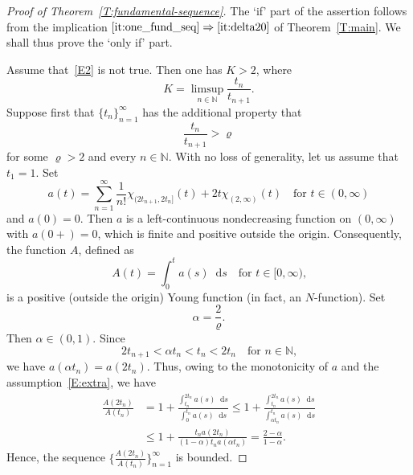\documentclass[nointlimits]{amsart}
\numberwithin{equation}{section}
\theoremstyle{plain}
\theoremstyle{definition}
\newcommand{\N}{\mathbb{N}}
\newcommand*\dd{\mathop{}\!\mathrm{d}}
\begin{document}
\begin{proof}[Proof of Theorem~\ref{T:fundamental-sequence}] 
The `if' part of the assertion follows from the implication 
$\ref{it:one_fund_seq}
\Rightarrow
\ref{it:delta20}
$ of Theorem~\ref{T:main}. We shall thus prove the `only if' part.

Assume that~\eqref{E2} is not true. Then one has $K>2$, where 
\begin{equation*}
    K=\limsup_{n\in\N} \frac{t_n}{t_{n+1}}.
\end{equation*}
Suppose first that $\{t_n\}_{n=1}^\infty$ has the additional property that 
\begin{equation}
    \label{E:extra}
    \frac{t_n}{t_{n+1}}>\varrho
\end{equation}
for some $\varrho>2$ and every $n\in\N$. With no loss of generality, let us assume that $t_1=1$. Set
\begin{equation*}
    a(t)=
    \sum_{n=1}^{\infty}
    \frac{1}{n!}\chi_{(2t_{n+1},2t_n]}(t)
    +2t\chi_{(2,\infty)}(t)
    \quad\text{for $t\in(0,\infty)$}
\end{equation*}
and $a(0)=0$. Then $a$ is a left-continuous nondecreasing function on $(0,\infty)$ with $a(0+)=0$, which is finite and positive outside the origin. Consequently, the function $A$, defined as
\begin{equation*}
    A(t)=
    \int_{0}^{t}a(s)\dd s
    \quad\text{for $t\in[0,\infty)$,}
\end{equation*}
is a positive (outside the origin) Young function (in fact, an $N$-function). Set
\begin{equation*}
    \alpha=
    \frac{2}{\varrho}.
\end{equation*}
Then $\alpha\in(0,1)$. Since
\begin{equation*}
    2t_{n+1} <\alpha t_n<t_n<2t_n
    \quad\text{for $n\in\N$,}
\end{equation*}
we have $a(\alpha t_n)=a(2t_n)$. Thus, owing to the monotonicity of $a$ and the assumption~\eqref{E:extra}, we have
\begin{align}
    \label{E:upper}
    \frac{A(2t_n)}{A(t_n)}
    &=
    1+\frac{\int_{t_n}^{2t_n}a(s)\dd s}{\int_{0}^{t_n}a(s)\dd s}
        \le
    1+\frac{\int_{t_n}^{2t_n}a(s)\dd s}{\int_{\alpha t_n}^{t_n}a(s)\dd s}
        \\
        &\le 
     1+\frac{t_na(2t_n)}{(1-\alpha)t_na(\alpha t_n)}
    =\frac{2-\alpha}{1-\alpha}.
    \nonumber
\end{align}
Hence, the sequence $\{\frac{A(2t_n)}{A(t_n)}\}_{n=1}^\infty$ is bounded.

\end{proof}
\end{document}
